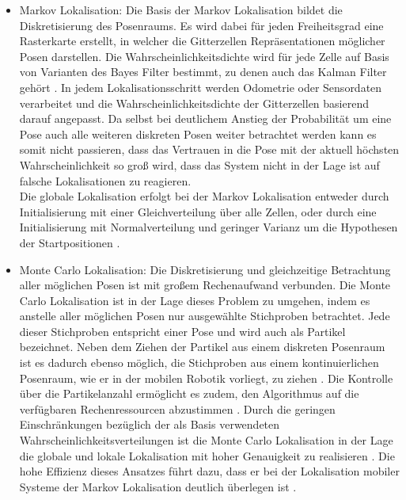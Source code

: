 \begin{itemize}
\item Markov Lokalisation: Die Basis der Markov Lokalisation bildet die Diskretisierung des Posenraums. Es wird dabei für jeden Freiheitsgrad eine Rasterkarte erstellt, in welcher die Gitterzellen Repräsentationen möglicher Posen darstellen. Die Wahrscheinlichkeitsdichte wird für jede Zelle auf Basis von Varianten des Bayes Filter bestimmt, zu denen auch das Kalman Filter gehört \cite{Hertzberg2012}. In jedem Lokalisationsschritt werden Odometrie oder Sensordaten verarbeitet und die Wahrscheinlichkeitsdichte der Gitterzellen basierend darauf angepasst. Da selbst bei deutlichem Anstieg der Probabilität um eine Pose auch alle weiteren diskreten Posen weiter betrachtet werden kann es somit nicht passieren, dass das Vertrauen in die Pose mit der aktuell höchsten Wahrscheinlichkeit so groß wird, dass das System nicht in der Lage ist auf falsche Lokalisationen zu reagieren.\\
Die globale Lokalisation erfolgt bei der Markov Lokalisation entweder durch Initialisierung mit einer Gleichverteilung über alle Zellen, oder durch eine Initialisierung mit Normalverteilung und geringer Varianz um die Hypothesen der Startpositionen \cite{Hertzberg2012}.\\

\item Monte Carlo Lokalisation: Die Diskretisierung und gleichzeitige Betrachtung aller möglichen Posen ist mit großem Rechenaufwand verbunden. Die Monte Carlo Lokalisation ist in der Lage dieses Problem zu umgehen, indem es anstelle aller möglichen Posen nur ausgewählte Stichproben betrachtet. Jede dieser Stichproben entspricht einer Pose und wird auch als Partikel bezeichnet. Neben dem Ziehen der Partikel aus einem diskreten Posenraum ist es dadurch ebenso möglich, die Stichproben aus einem kontinuierlichen Posenraum, wie er in der mobilen Robotik vorliegt, zu ziehen \cite{Fox2001}. Die Kontrolle über die Partikelanzahl ermöglicht es zudem, den Algorithmus auf die verfügbaren Rechenressourcen abzustimmen \cite{Thrun2001}. Durch die geringen Einschränkungen bezüglich der als Basis verwendeten Wahrscheinlichkeitsverteilungen ist die Monte Carlo Lokalisation in der Lage die globale und lokale Lokalisation mit hoher Genauigkeit zu realisieren \cite{Thrun2005}. Die hohe Effizienz dieses Ansatzes führt dazu, dass er bei der Lokalisation mobiler Systeme der Markov Lokalisation deutlich überlegen ist \cite{Fox2001}.
\end{itemize}

